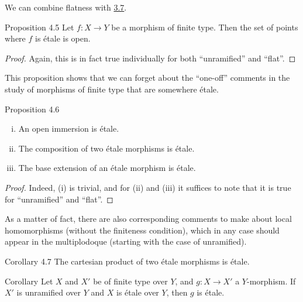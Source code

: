 We can combine flatness with \hyperref[I.3.7]{3.7}.

\begin{itenv}{Proposition 4.5}
\label{I.4.5}
  Let $f\colon X\to Y$ be a morphism of finite type.
  Then the set of points where $f$ is \'{e}tale is open.
\end{itenv}

\begin{proof}
  Again, this is in fact true individually for both ``unramified'' and ``flat''.
\end{proof}

This proposition shows that we can forget about the ``one-off'' comments in the study of morphisms of finite type that are somewhere \'{e}tale.

\begin{itenv}{Proposition 4.6}
\label{I.4.6}
  \begin{enumerate}[(i)]
    \item An open immersion is \'{e}tale.
    \item The composition of two \'{e}tale morphisms is \'{e}tale.
    \item The base extension of an \'{e}tale morphism is \'{e}tale.
  \end{enumerate}
\end{itenv}

\begin{proof}
  Indeed, (i) is trivial, and for (ii) and (iii) it suffices to note that it is true for ``unramified'' and ``flat''.
\end{proof}

As a matter of fact, there are also corresponding comments to make about local homomorphisms (without the finiteness condition), which in any case should appear in the multiplodoque (starting with the case of unramified).

\begin{itenv}{Corollary 4.7}
\label{I.4.7}
  The cartesian product of two \'{e}tale morphisms is \'{e}tale.
\end{itenv}

\begin{itenv}{Corollary}
\label{I.4.8}
  Let $X$ and $X'$ be of finite type over $Y$, and $g\colon X\to X'$ a $Y$-morphism.
  If $X'$ is unramified over $Y$ and $X$ is \'{e}tale over $Y$, then $g$ is \'{e}tale.
\end{itenv}


